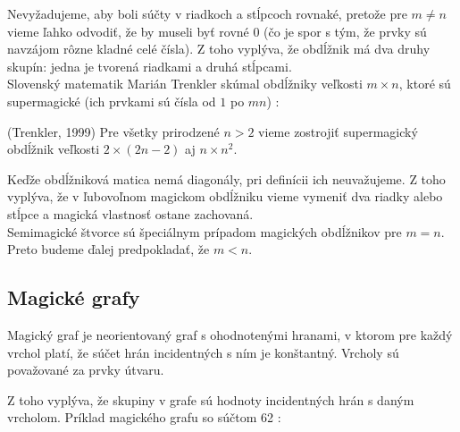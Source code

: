 Nevyžadujeme, aby boli súčty v riadkoch a stĺpcoch rovnaké, pretože pre $m \neq n$ vieme ľahko odvodiť, že by museli byť rovné $0$ (čo je spor s tým, že prvky sú navzájom rôzne kladné celé čísla). Z toho vyplýva, že obdĺžnik má dva druhy skupín: jedna je tvorená riadkami a druhá stĺpcami. \\

Slovenský matematik Marián Trenkler skúmal obdĺžniky veľkosti $m \times n$, ktoré sú supermagické (ich prvkami sú čísla od $1$ po $mn$) \cite{rectangles}:

\begin{theorem} (Trenkler, 1999) Pre všetky prirodzené $n > 2$ vieme zostrojiť supermagický obdĺžnik veľkosti $2 \times (2n - 2)$ aj $n \times n^2$.
\end{theorem}

Keďže obdĺžniková matica nemá diagonály, pri definícii ich neuvažujeme. Z toho vyplýva, že v ľubovoľnom magickom obdĺžniku vieme vymeniť dva riadky alebo stĺpce a magická vlastnosť ostane zachovaná. \\

Semimagické štvorce sú špeciálnym prípadom magických obdĺžnikov pre $m = n$. Preto budeme ďalej predpokladať, že $m < n$.

\subsection{Magické grafy}
\begin{definition} Magický graf je neorientovaný graf s ohodnotenými hranami, v ktorom pre každý vrchol platí, že súčet hrán incidentných s ním je konštantný. Vrcholy sú považované za prvky útvaru.
\end{definition}

Z toho vyplýva, že skupiny v grafe sú hodnoty incidentných hrán s daným vrcholom. Príklad magického grafu so súčtom 62 \cite{antimagic}:

